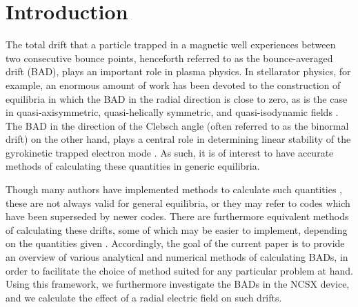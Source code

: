 
\section{Introduction}
The total drift that a particle trapped in a magnetic well experiences between two consecutive bounce points, henceforth referred to as the bounce-averaged drift (BAD), plays an important role in plasma physics. In stellarator physics, for example, an enormous amount of work has been devoted to the construction of equilibria in which the BAD in the radial direction is close to zero, as is the case in quasi-axisymmetric, quasi-helically symmetric, and quasi-isodynamic fields \cite{boozer1983transport,rodriguez2020necessary,beidler2021demonstration,landreman2022magnetic,goodman2022constructing}. The BAD in the direction of the Clebsch angle (often referred to as the binormal drift) on the other hand, plays a central role in determining linear stability of the gyrokinetic trapped electron mode \cite{proll2012resilience,helander2013collisionless,helander2017available}. As such, it is of interest to have accurate methods of calculating these quantities in generic equilibria. \par 
Though many authors have implemented methods to calculate such quantities \cite{white1984hamiltonian,roach1995trapped,marinoni2009effect,proll2015tem,gan2021self,stephens2021quasilinear,mackenbach2022available}, these are not always valid for general equilibria, or they may refer to codes which have been superseded by newer codes. There are furthermore equivalent methods of calculating these drifts, some of which may be easier to implement, depending on the quantities given \cite{helander2005collisional,hegna2015effect}. Accordingly, the goal of the current paper is to provide an overview of various analytical and numerical methods of calculating BADs, in order to facilitate the choice of method suited for any particular problem at hand. Using this framework, we furthermore investigate the BADs in the NCSX device, and we calculate the effect of a radial electric field on such drifts.

